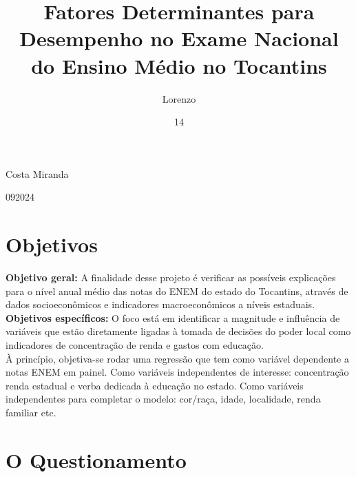\documentclass[tcc1,project]{uftex}
\begin{document}
  \title{Fatores Determinantes para Desempenho no Exame Nacional do Ensino Médio no Tocantins}
  \author{Lorenzo}{Costa Miranda}

  \date{14}{09}{2024}

  

  \maketitle

  \begin{abstract}


 \end{abstract}


\section*{Objetivos}

\textbf{Objetivo geral:} A finalidade desse projeto é verificar as possíveis explicações para o nível anual médio das notas do ENEM do estado do Tocantins, através de dados socioeconômicos e indicadores macroeconômicos a níveis estaduais.\\

\textbf{Objetivos específicos:} O foco está em identificar a magnitude e influência de variáveis que estão diretamente ligadas à tomada de decisões do poder local como indicadores de concentração de renda e gastos com educação. \\

À princípio, objetiva-se rodar uma regressão que tem como variável dependente a notas ENEM em painel. Como variáveis independentes de interesse: concentração renda estadual e verba dedicada à educação no estado. Como variáveis independentes para completar o modelo: cor/raça, idade, localidade, renda familiar etc. 

\section*{O Questionamento}
\end{document}
